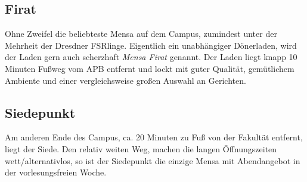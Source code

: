 \subsection*{Firat}
Ohne Zweifel die beliebteste Mensa auf dem Campus, zumindest unter der Mehrheit der Dresdner FSRlinge.
Eigentlich ein unabhängiger Dönerladen, wird der Laden gern auch scherzhaft \emph{Mensa Firat} genannt.
Der Laden liegt knapp 10 Minuten Fußweg vom APB entfernt und lockt mit guter Qualität, gemütlichem Ambiente und einer vergleichsweise großen Auswahl an Gerichten.

\subsection*{Siedepunkt}
Am anderen Ende des Campus, ca. 20 Minuten zu Fuß von der Fakultät entfernt, liegt der Siede.
Den relativ weiten Weg, machen die langen Öffnungszeiten wett/alternativlos, so ist der Siedepunkt die einzige Mensa mit Abendangebot in der vorlesungsfreien Woche.

